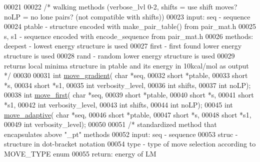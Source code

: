 \begin{DoxyCode}
00021 
00022 \textcolor{comment}{/* walking methods (verbose\_lvl 0-2, shifts = use shift moves? noLP = no lone pairs? (not compatible with
       shifts))}
00023 \textcolor{comment}{    input:    seq - sequence}
00024 \textcolor{comment}{              ptable - structure encoded with make\_pair\_table() from pair\_mat.h}
00025 \textcolor{comment}{              s, s1 - sequence encoded with encode\_sequence from pair\_mat.h}
00026 \textcolor{comment}{    methods:  deepest - lowest energy structure is used}
00027 \textcolor{comment}{              first - first found lower energy structure is used}
00028 \textcolor{comment}{              rand - random lower energy structure is used}
00029 \textcolor{comment}{    returns local minima structure in ptable and its energy in 10kcal/mol as output */}
00030 
00031 \textcolor{keywordtype}{int} \mbox{\hyperlink{move__set_8h_a6fbecd725c2d050f7ad9a9693d4bc1c9}{move\_gradient}}( \textcolor{keywordtype}{char} *seq,
00032                   \textcolor{keywordtype}{short} *ptable,
00033                   \textcolor{keywordtype}{short} *s,
00034                   \textcolor{keywordtype}{short} *s1,
00035                   \textcolor{keywordtype}{int} verbosity\_level,
00036                   \textcolor{keywordtype}{int} shifts,
00037                   \textcolor{keywordtype}{int} noLP);
00038 \textcolor{keywordtype}{int} \mbox{\hyperlink{move__set_8h_abe38e8543fb1f324689598561a1f4a99}{move\_first}}( \textcolor{keywordtype}{char} *seq,
00039                 \textcolor{keywordtype}{short} *ptable,
00040                 \textcolor{keywordtype}{short} *s,
00041                 \textcolor{keywordtype}{short} *s1,
00042                 \textcolor{keywordtype}{int} verbosity\_level,
00043                 \textcolor{keywordtype}{int} shifts,
00044                 \textcolor{keywordtype}{int} noLP);
00045 \textcolor{keywordtype}{int} \mbox{\hyperlink{move__set_8h_aa6ad9ee21f1c236dc57fcda2c7bbb0b3}{move\_adaptive}}(  \textcolor{keywordtype}{char} *seq,
00046                 \textcolor{keywordtype}{short} *ptable,
00047                 \textcolor{keywordtype}{short} *s,
00048                 \textcolor{keywordtype}{short} *s1,
00049                 \textcolor{keywordtype}{int} verbosity\_level);
00050 
00051 \textcolor{comment}{/* standardized method that encapsulates above "\_pt" methods}
00052 \textcolor{comment}{  input:  seq - sequence}
00053 \textcolor{comment}{          struc - structure in dot-bracket notation}
00054 \textcolor{comment}{          type - type of move selection according to MOVE\_TYPE enum}
00055 \textcolor{comment}{  return: energy of LM}

\end{DoxyCode}
